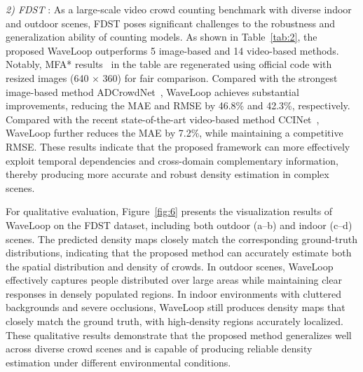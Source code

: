 \documentclass[lettersize,journal]{IEEEtran}
\begin{document}
\textit{2) FDST} \cite{fang2019locality}:
As a large-scale video crowd counting benchmark with diverse indoor and outdoor scenes, FDST poses significant challenges to the robustness and generalization ability of counting models. As shown in Table~\ref{tab:2}, the proposed WaveLoop outperforms 5 image-based and 14 video-based methods. Notably, MFA* results~\cite{ling2023motional} in the table are regenerated using official code with resized images (640 $\times$ 360) for fair comparison. Compared with the strongest image-based method ADCrowdNet~\cite{liu2019adcrowdnet}, WaveLoop achieves substantial improvements, reducing the MAE and RMSE by 46.8\% and 42.3\%, respectively. Compared with the recent state-of-the-art video-based method CCINet~\cite{ling2026cascaded}, WaveLoop further reduces the MAE by 7.2\%, while maintaining a competitive RMSE. These results indicate that the proposed framework can more effectively exploit temporal dependencies and cross-domain complementary information, thereby producing more accurate and robust density estimation in complex scenes.

For qualitative evaluation, Figure~\ref{fig:6} presents the visualization results of WaveLoop on the FDST dataset, including both outdoor (a–b) and indoor (c–d) scenes. The predicted density maps closely match the corresponding ground-truth distributions, indicating that the proposed method can accurately estimate both the spatial distribution and density of crowds. In outdoor scenes, WaveLoop effectively captures people distributed over large areas while maintaining clear responses in densely populated regions. In indoor environments with cluttered backgrounds and severe occlusions, WaveLoop still produces density maps that closely match the ground truth, with high-density regions accurately localized. These qualitative results demonstrate that the proposed method generalizes well across diverse crowd scenes and is capable of producing reliable density estimation under different environmental conditions.

\end{document}
